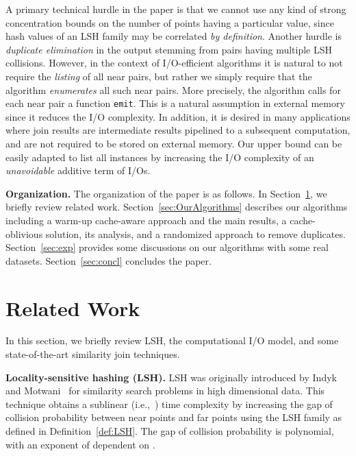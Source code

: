 \documentclass{llncs}
\begin{document}
A primary technical hurdle in the paper is that we cannot use any kind of strong concentration bounds on the number of points having a particular value, since hash values of an LSH family may be correlated \emph{by definition}. 
Another hurdle is \emph{duplicate elimination} in the output stemming from pairs having multiple LSH collisions. 
However, in the context of I/O-efficient algorithms it is natural to not require the {\em listing\/} of all near pairs, but rather we simply require that the algorithm {\em enumerates\/} all such near pairs.
More precisely, the algorithm calls for each near pair  a function \texttt{emit}. 
This is a natural assumption in external memory since it reduces the I/O complexity. 
In addition, it is desired in many applications where join results are intermediate results pipelined to a subsequent computation, and are not required to be stored on external memory.
Our upper bound can be easily adapted to list all instances by increasing the I/O complexity of an \textit{unavoidable} additive term of  I/Os.


\smallskip

\textbf{Organization.}
The organization of the paper is as follows. 
In Section~\ref{sec:RelatedWork}, we briefly review related work. 
Section~\ref{sec:OurAlgorithms} describes our algorithms including a warm-up cache-aware approach and the main results, a cache-oblivious solution, its analysis, and a randomized approach to remove duplicates. 
Section~\ref{sec:exp} provides some discussions on our
algorithms with some real datasets.
Section~\ref{sec:concl} concludes the paper.

\section{Related Work}\label{sec:RelatedWork}

In this section, we briefly review LSH, the computational I/O model, and some
state-of-the-art similarity join techniques.


\smallskip

\textbf{Locality-sensitive hashing (LSH).}
LSH was originally introduced by Indyk and Motwani~\cite{Indyk_STOC98} for
similarity search problems in high dimensional data. 
This technique obtains a sublinear (i.e.,~) time complexity by increasing the gap of collision probability between near points and far points using the LSH family as defined in Definition~\ref{def:LSH}. 
The gap of collision probability is polynomial, with an exponent of  dependent on .  
\end{document}

